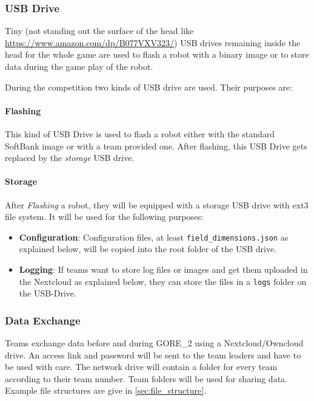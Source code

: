 \subsubsection{USB Drive}
\label{sec:c3_USB_Drive}
Tiny (not standing out the surface of the head like \url{https://www.amazon.com/dp/B077VXV323/}) USB drives remaining inside the head for the whole game are used to flash a robot with a binary image or to store data during the game play of the robot.

During the competition two kinds of USB drive are used. Their purposes are:

\paragraph*{Flashing}
This kind of USB Drive is used to flash a robot either with the standard SoftBank image or with a team provided one. After flashing, this USB Drive gets replaced by the \textit{storage} USB drive.

\paragraph*{Storage}
After \textit{Flashing} a robot, they will be equipped with a storage USB drive with ext3 file system. It will be used for the following purposes:

\begin{itemize}
	\item \textbf{Configuration}: Configuration files, at least \texttt{field\_dimensions.json} as explained below, will be copied into the root folder of the USB drive.
	\item  \textbf{Logging}: If teams want to store log files or images and get them uploaded in the Nextcloud as explained below, they can store the files in a \texttt{logs} folder on the USB-Drive.
\end{itemize}

\subsubsection{Data Exchange}
\label{sec:data_exchange}
Teams exchange data before and during GORE\_2 using a Nextcloud/Owncloud drive. An access link and password will be sent to the team leaders and have to be used with care. The network drive will contain a folder for every team according to their team number. Team folders will be used for sharing data. Example file structures are give in \ref{sec:file_structure}. 


